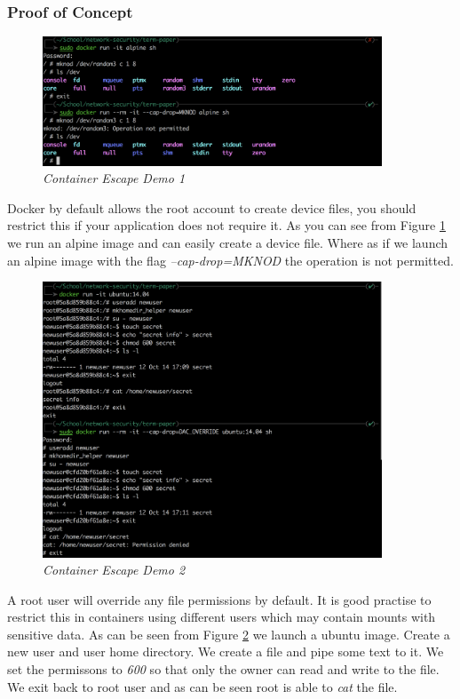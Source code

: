 \subsubsection{Proof of Concept}
\begin{figure}[!ht]
\centering
\includegraphics*[width=0.9\textwidth]{images/term3.png}
\caption{\em Container Escape Demo 1}
\label{img:demo3}
\end{figure}
Docker by default allows the root account to create device files, you should restrict this if your application does not require it. As you can see from Figure \ref{img:demo3} we run an alpine image and can easily create a device file. Where as if we launch an alpine image with the flag \textit{--cap-drop=MKNOD} the operation is not permitted.
\begin{figure}[!ht]
\centering
\includegraphics*[width=0.9\textwidth]{images/term4.png}
\caption{\em Container Escape Demo 2}
\label{img:demo4}
\end{figure}
A root user will override any file permissions by default. It is good practise to restrict this in containers using different users which may contain mounts with sensitive data. As can be seen from Figure \ref{img:demo4} we launch a ubuntu image. Create a new user and user home directory. We create a file and pipe some text to it. We set the permissons to \textit{600} so that only the owner can read and write to the file. We exit back to root user and as can be seen root is able to \textit{cat} the file. 


